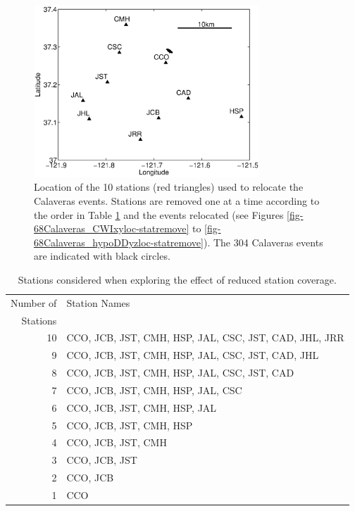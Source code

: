 \documentclass[extra]{gji}
\begin{document}
\begin{figure}
\noindent\includegraphics[width = 20pc]{diags/CalaverasMap/matlab/Calaveras_substationmap}
\caption{Location of the 10 stations (red triangles) used to relocate the Calaveras events.
Stations are removed one at a time according to the order in Table \ref{tab:Calaveras-stationremoval} and the events
relocated (see Figures \ref{fig-68Calaveras_CWIxyloc-statremove} to \ref{fig-68Calaveras_hypoDDyzloc-statremove}).
The 304 Calaveras events are indicated with black circles.}
\label{fig:-eqopti-Calaveras-substations}
\end{figure}

\begin{table}
\caption{Stations considered when exploring the effect of reduced station coverage.}
\label{tab:Calaveras-stationremoval}
\begin{tabular}{|r|l|}
\hline
Number of & Station Names\\
Stations  & \\
\hline
10 & CCO, JCB, JST, CMH, HSP, JAL, CSC, JST, CAD, JHL, JRR\\
9  & CCO, JCB, JST, CMH, HSP, JAL, CSC, JST, CAD, JHL\\
8  & CCO, JCB, JST, CMH, HSP, JAL, CSC, JST, CAD\\
7  & CCO, JCB, JST, CMH, HSP, JAL, CSC \\
6  & CCO, JCB, JST, CMH, HSP, JAL \\
5  & CCO, JCB, JST, CMH, HSP \\
4  & CCO, JCB, JST, CMH \\
3  & CCO, JCB, JST \\
2  & CCO, JCB \\
1  & CCO \\
\hline
\end{tabular}
\end{table}
\end{document}

